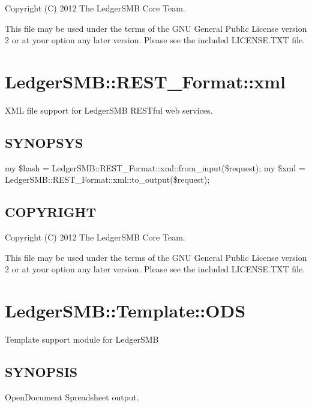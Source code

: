 \begin{description}
\begin{description}
\begin{description}
\begin{description}
\begin{description}
\begin{description}
\begin{description}
\begin{description}
\begin{description}
\begin{description}
Copyright (C) 2012 The LedgerSMB Core Team.



This file may be used under the terms of the GNU General Public License 
version 2 or at your option any later version.  Please see the included
LICENSE.TXT file.

\section{LedgerSMB::REST\_Format::xml\label{LedgerSMB::REST_Format::xml}}


XML file support for LedgerSMB RESTful web 
services.

\subsection*{SYNOPSYS\label{LedgerSMB::REST_Format::xml_SYNOPSYS}}


my \$hash = LedgerSMB::REST\_Format::xml::from\_input(\$request);
my \$xml = LedgerSMB::REST\_Format::xml::to\_output(\$request);

\subsection*{COPYRIGHT\label{LedgerSMB::REST_Format::xml_COPYRIGHT}}


Copyright (C) 2012 The LedgerSMB Core Team.



This file may be used under the terms of the GNU General Public License 
version 2 or at your option any later version.  Please see the included
LICENSE.TXT file.

\section{LedgerSMB::Template::ODS\label{LedgerSMB::Template::ODS}}


Template support module for LedgerSMB

\subsection*{SYNOPSIS\label{LedgerSMB::Template::ODS_SYNOPSIS}}


OpenDocument Spreadsheet output.


\end{description}
\end{description}
\end{description}
\end{description}
\end{description}
\end{description}
\end{description}
\end{description}
\end{description}
\end{description}
